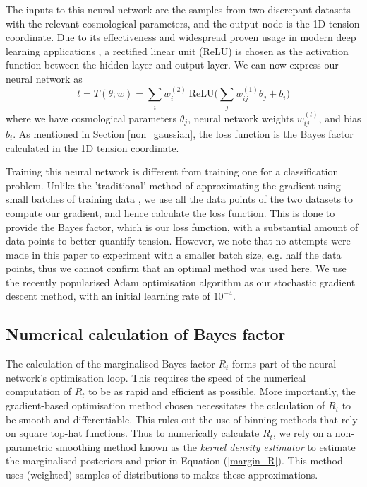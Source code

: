 \documentclass[%
 reprint,
 amsmath,amssymb,
 aps,
]{revtex4-2}
\begin{document}
The inputs to this neural network are the samples from two discrepant datasets with the relevant cosmological parameters, and the output node is the 1D tension coordinate. Due to its effectiveness and widespread proven usage in modern deep learning applications \cite{Nwankpa2018}, a rectified linear unit (ReLU) \cite{Nair2010} is chosen as the activation function between the hidden layer and output layer. We can now express our neural network as
\begin{equation}
    t = T(\theta; w) = \sum_i w^{(2)}_i \ \textrm{ReLU} \bigg( \sum_j w^{(1)}_{ij} \theta_j + b_i \bigg)
\end{equation}
where we have cosmological parameters $\theta_{j}$, neural network weights $w^{(l)}_{ij}$, and bias $b_i$. As mentioned in Section \ref{non_gaussian}, the loss function is the Bayes factor calculated in the 1D tension coordinate.

Training this neural network is different from training one for a classification problem. Unlike the 'traditional' method of approximating the gradient using small batches of training data \cite{Keskar2017}, we use all the data points of the two datasets to compute our gradient, and hence calculate the loss function. This is done to provide the Bayes factor, which is our loss function, with a substantial amount of data points to better quantify tension. However, we note that no attempts were made in this paper to experiment with a smaller batch size, e.g. half the data points, thus we cannot confirm that an optimal method was used here. We use the recently popularised Adam optimisation algorithm \cite{Kingma2017} as our stochastic gradient descent method, with an initial learning rate of $10^{-4}$.


\subsection{Numerical calculation of Bayes factor} \label{section:numerical_bf}

The calculation of the marginalised Bayes factor $R_t$ forms part of the neural network's optimisation loop. This requires the speed of the numerical computation of $R_t$ to be as rapid and efficient as possible. More importantly, the gradient-based optimisation method chosen necessitates the calculation of $R_t$ to be smooth and differentiable. This rules out the use of binning methods that rely on square top-hat functions. Thus to numerically calculate $R_t$, we rely on a non-parametric smoothing method known as the \textit{kernel density estimator} \cite{Rosenblatt1956, Silverman1986} to estimate the marginalised posteriors and prior in Equation (\ref{margin_R}). This method uses (weighted) samples of distributions to makes these approximations.
\end{document}
